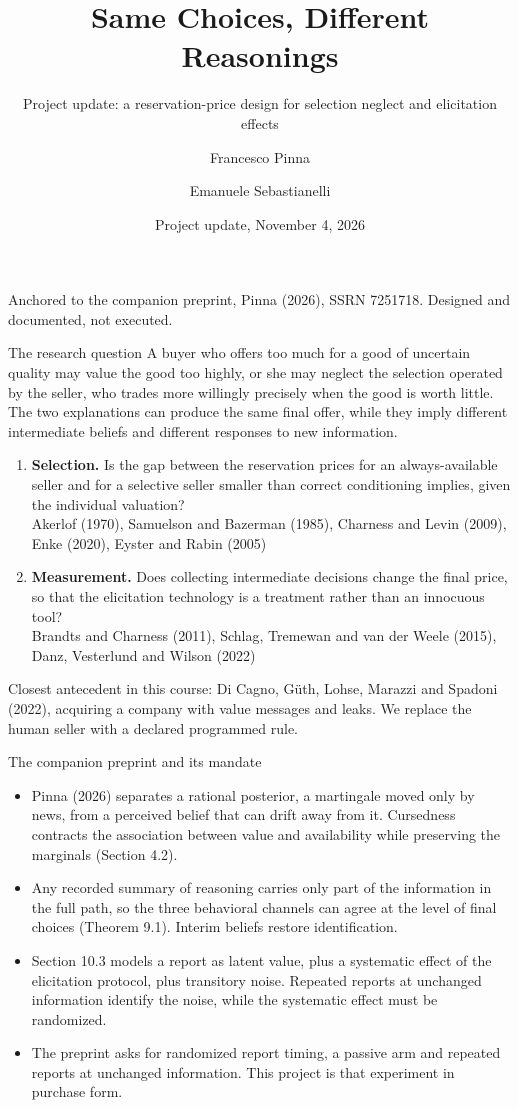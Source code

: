 \documentclass[aspectratio=169,11pt]{beamer}
\title{Same Choices, Different Reasonings}
\subtitle{Project update: a reservation-price design for selection neglect and elicitation effects}
\author{Francesco Pinna \and Emanuele Sebastianelli}
\institute{Experimental and Behavioural Economics, LUISS Guido Carli\\ Daniela Di Cagno and Irene Maria Buso}
\date{Project update, November 4, 2026}
\begin{document}
\begin{frame}
\titlepage
\begin{center}\footnotesize
Anchored to the companion preprint, Pinna (2026), SSRN 7251718. Designed and documented, not executed.
\end{center}
\end{frame}

\begin{frame}{The research question}
\small
A buyer who offers too much for a good of uncertain quality may value the good too highly, or she may neglect the selection operated by the seller, who trades more willingly precisely when the good is worth little. The two explanations can produce the same final offer, while they imply different intermediate beliefs and different responses to new information.
\begin{enumerate}
\item \textbf{Selection.} Is the gap between the reservation prices for an always-available seller and for a selective seller smaller than correct conditioning implies, given the individual valuation? \\ {\footnotesize Akerlof (1970), Samuelson and Bazerman (1985), Charness and Levin (2009), Enke (2020), Eyster and Rabin (2005)}
\item \textbf{Measurement.} Does collecting intermediate decisions change the final price, so that the elicitation technology is a treatment rather than an innocuous tool? \\ {\footnotesize Brandts and Charness (2011), Schlag, Tremewan and van der Weele (2015), Danz, Vesterlund and Wilson (2022)}
\end{enumerate}
\vfill
{\footnotesize Closest antecedent in this course: Di Cagno, G\"uth, Lohse, Marazzi and Spadoni (2022), acquiring a company with value messages and leaks. We replace the human seller with a declared programmed rule.}
\end{frame}

\begin{frame}{The companion preprint and its mandate}
\begin{itemize}
\item Pinna (2026) separates a rational posterior, a martingale moved only by news, from a perceived belief that can drift away from it. Cursedness contracts the association between value and availability while preserving the marginals (Section 4.2).
\item Any recorded summary of reasoning carries only part of the information in the full path, so the three behavioral channels can agree at the level of final choices (Theorem 9.1). Interim beliefs restore identification.
\item Section 10.3 models a report as latent value, plus a systematic effect of the elicitation protocol, plus transitory noise. Repeated reports at unchanged information identify the noise, while the systematic effect must be randomized.
\item The preprint asks for randomized report timing, a passive arm and repeated reports at unchanged information. This project is that experiment in purchase form.
\end{itemize}
\end{frame}
\end{document}
